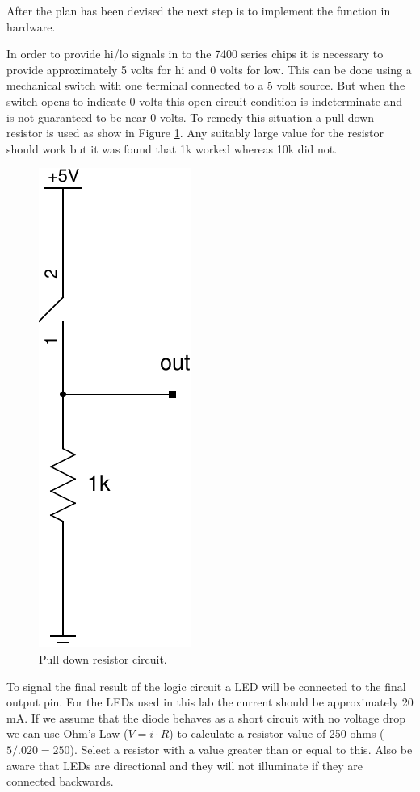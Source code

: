 \documentclass[12pt]{article}
\begin{document}
After the plan has been devised the next step is to implement the
function in hardware.

In order to provide hi/lo signals in to the 7400 series chips
\cite{wiki:7400_series} it is necessary to provide approximately 5 volts for
hi and 0 volts for low.
This can be done using a mechanical switch with one terminal connected
to a 5 volt source.
But when the switch opens to indicate 0 volts this open circuit condition
is indeterminate and is not guaranteed to be near 0 volts.
To remedy this situation a pull down resistor is used as show in Figure \ref{fig:pulldown}.
Any suitably large value for the resistor should work but it was found
that 1k worked whereas 10k did not.

\begin{figure}[!hbtp]
\center
\includegraphics[scale=0.6]{pulldown}
\caption{Pull down resistor circuit.}
\label{fig:pulldown}
\end{figure}

To signal the final result of the logic circuit a LED will
be connected to the final output pin.
For the LEDs used in this lab the current should be approximately
20 mA.
If we assume that the diode behaves as a short circuit with
no voltage drop we can use Ohm's Law ($V = i \cdot R$) to calculate a
resistor value of 250 ohms ($5 / .020 = 250$).
Select a resistor with a value greater than or equal to this.
Also be aware that LEDs are directional and they will not illuminate
if they are connected backwards.
\end{document}
